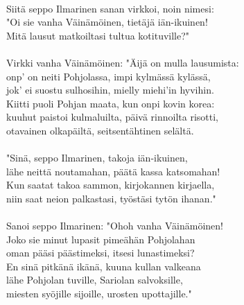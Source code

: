                                                                   \\
Siitä seppo Ilmarinen sanan virkkoi, noin nimesi:                 \\
"Oi sie vanha Väinämöinen, tietäjä iän-ikuinen!                   \\
Mitä lausut matkoiltasi tultua kotituville?"                      \\
                                                                  \\
Virkki vanha Väinämöinen: "Äijä on mulla lausumista:              \\
onp' on neiti Pohjolassa, impi kylmässä kylässä,                  \\
jok' ei suostu sulhosihin, mielly miehi'in hyvihin.               \\
Kiitti puoli Pohjan maata, kun onpi kovin korea:                  \\
kuuhut paistoi kulmaluilta, päivä rinnoilta risotti,              \\
otavainen olkapäiltä, seitsentähtinen selältä.                    \\
                                                                  \\
"Sinä, seppo Ilmarinen, takoja iän-ikuinen,                       \\
lähe neittä noutamahan, päätä kassa katsomahan!                   \\
Kun saatat takoa sammon, kirjokannen kirjaella,                   \\
niin saat neion palkastasi, työstäsi tytön ihanan."               \\
                                                                  \\
Sanoi seppo Ilmarinen: "Ohoh vanha Väinämöinen!                   \\
Joko sie minut lupasit pimeähän Pohjolahan                        \\
oman pääsi päästimeksi, itsesi lunastimeksi?                      \\
En sinä pitkänä ikänä, kuuna kullan valkeana                      \\
lähe Pohjolan tuville, Sariolan salvoksille,                      \\
miesten syöjille sijoille, urosten upottajille."                  \\
                                                                  \\
